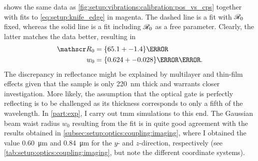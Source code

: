  shows the same data as \cref{fig:setup:vibrations:calibration:pos_vs_cps} together with fits to \cref{eq:setup:knife_edge} in magenta.
The dashed line is a fit with $\mathscr{R}_0$ fixed, whereas the solid line is a fit including $\mathscr{R}_0$ as a free parameter.
Clearly, the latter matches the data better, resulting in
\begin{align}
    \reflectance_0 &= \qty{65.1+-1.4}{\percent} \\
    w_0 &= \qty{0.624+-0.028}{\micro\meter}.
\end{align}
The discrepancy in reflectance might be explained by multilayer and thin-film effects given that the sample is only \qty{220}{\nano\meter} thick and warrants closer investigation.
More likely, the assumption that the  optical gate is perfectly reflecting is to be challenged as its thickness corresponds to only a fifth of the wavelength.
In \cref{part:exp}, I carry out \gls{tmm} simulations to this end.
The Gaussian beam waist radius $w_0$ resulting from the fit is in quite good agreement with the results obtained in \cref{subsec:setup:optics:coupling:imaging}, where I obtained the value \qty{0.60}{\micro\meter} and \qty{0.84}{\micro\meter} for the $y$- and $z$-direction, respectively (see \cref{tab:setup:optics:coupling:imaging}, but note the different coordinate systems).
